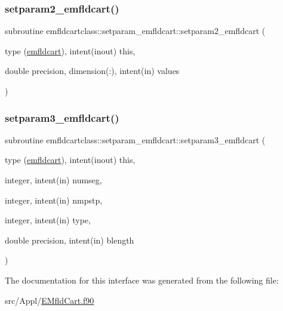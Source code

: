 \mbox{\label{interfaceemfldcartclass_1_1setparam__emfldcart_aa53d2bf171490337016462da90d65d65}} 
\subsubsection{\texorpdfstring{setparam2\_emfldcart()}{setparam2\_emfldcart()}}
{\footnotesize\ttfamily subroutine emfldcartclass\+::setparam\+\_\+emfldcart\+::setparam2\+\_\+emfldcart (\begin{DoxyParamCaption}\item[{type (\mbox{\hyperlink{namespaceemfldcartclass_structemfldcartclass_1_1emfldcart}{emfldcart}}), intent(inout)}]{this,  }\item[{double precision, dimension(\+:), intent(in)}]{values }\end{DoxyParamCaption})}

\mbox{\label{interfaceemfldcartclass_1_1setparam__emfldcart_afe0ff5cd84f8cbfd15f0510209fb985b}} 
\subsubsection{\texorpdfstring{setparam3\_emfldcart()}{setparam3\_emfldcart()}}
{\footnotesize\ttfamily subroutine emfldcartclass\+::setparam\+\_\+emfldcart\+::setparam3\+\_\+emfldcart (\begin{DoxyParamCaption}\item[{type (\mbox{\hyperlink{namespaceemfldcartclass_structemfldcartclass_1_1emfldcart}{emfldcart}}), intent(inout)}]{this,  }\item[{integer, intent(in)}]{numseg,  }\item[{integer, intent(in)}]{nmpstp,  }\item[{integer, intent(in)}]{type,  }\item[{double precision, intent(in)}]{blength }\end{DoxyParamCaption})}



The documentation for this interface was generated from the following file\+:\begin{DoxyCompactItemize}
\item 
src/\+Appl/\mbox{\hyperlink{_e_mfld_cart_8f90}{E\+Mfld\+Cart.\+f90}}\end{DoxyCompactItemize}
